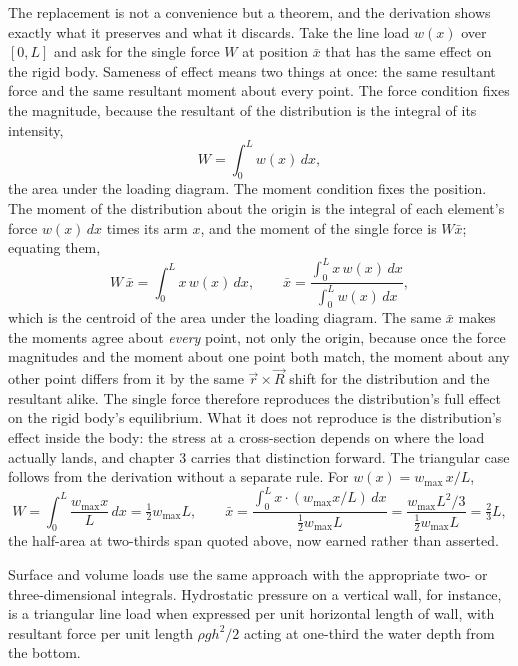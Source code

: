 The replacement is not a convenience but a theorem, and the derivation
shows exactly what it preserves and what it discards. Take the line load
$w(x)$ over $[0, L]$ and ask for the single force $W$ at position
$\bar{x}$ that has the same effect on the rigid body. Sameness of effect
means two things at once: the same resultant force and the same resultant
moment about every point. The force condition fixes the magnitude,
because the resultant of the distribution is the integral of its
intensity,
\[
W = \int_0^L w(x)\,dx,
\]
the area under the loading diagram. The moment condition fixes the
position. The moment of the distribution about the origin is the integral
of each element's force $w(x)\,dx$ times its arm $x$, and the moment of
the single force is $W\bar{x}$; equating them,
\[
W\,\bar{x} = \int_0^L x\,w(x)\,dx, \qquad
\bar{x} = \frac{\int_0^L x\,w(x)\,dx}{\int_0^L w(x)\,dx},
\]
which is the centroid of the area under the loading diagram. The same
$\bar{x}$ makes the moments agree about \emph{every} point, not only the
origin, because once the force magnitudes and the moment about one point
both match, the moment about any other point differs from it by the same
$\vec{r}\times\vec{R}$ shift for the distribution and the resultant
alike. The single force therefore reproduces the distribution's full
effect on the rigid body's equilibrium. What it does not reproduce is the
distribution's effect inside the body: the stress at a cross-section
depends on where the load actually lands, and chapter 3 carries that
distinction forward. The triangular case follows from the derivation
without a separate rule. For $w(x) = w_{\max}\,x/L$,
\[
W = \int_0^L \frac{w_{\max}x}{L}\,dx = \tfrac12 w_{\max}L, \qquad
\bar{x} = \frac{\int_0^L x\cdot(w_{\max}x/L)\,dx}{\tfrac12 w_{\max}L}
= \frac{w_{\max}L^2/3}{\tfrac12 w_{\max}L} = \tfrac23 L,
\]
the half-area at two-thirds span quoted above, now earned rather than
asserted.

Surface and volume loads use the same approach with the
appropriate two- or three-dimensional integrals. Hydrostatic
pressure on a vertical wall, for instance, is a triangular line
load when expressed per unit horizontal length of wall, with
resultant force per unit length $\rho g h^2 / 2$ acting at one-third
the water depth from the bottom.


